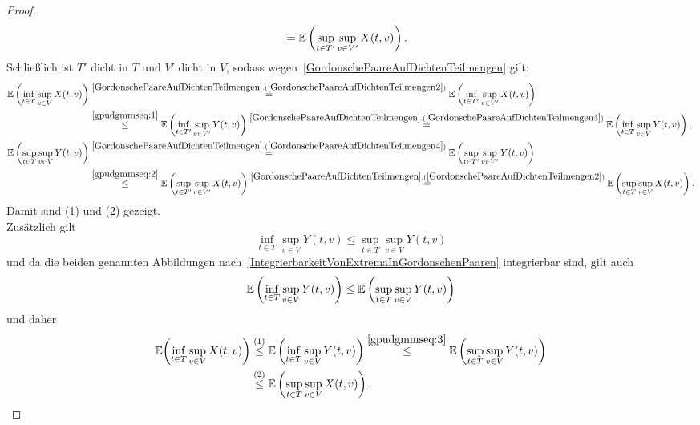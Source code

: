 \begin{proof}
\begin{align}
&= \mathbb{E}\left(\sup_{t \in T'}\sup_{v \in V'}X(t, v)\right)\text.
\label{gpudgmmseq:2}
\end{align}
Schließlich ist $T'$ dicht in $T$ und $V'$ dicht in $V$, sodass wegen~\ref{GordonschePaareAufDichtenTeilmengen} gilt:
\begin{align*}
\E\left(\inf_{t \in T}\sup_{v\in V}X(t,v) \right)
&\overset{\refclaim{GordonschePaareAufDichtenTeilmengen}
{GordonschePaareAufDichtenTeilmengen2}}=
\E\left(\inf_{t \in T'}\sup_{v\in V'}X(t,v) \right)\\
& \overset{\eqref{gpudgmmseq:1}}\le
\E\left(\inf_{t \in T'}\sup_{v\in V'}Y(t,v) \right)
\overset{\refclaim{GordonschePaareAufDichtenTeilmengen}
{GordonschePaareAufDichtenTeilmengen4}}=
\E\left(\inf_{t \in T}\sup_{v\in V}Y(t,v) \right)\text,\\
\E\left(\sup_{t \in T}\sup_{v\in V}Y(t,v) \right)
&\overset{\refclaim{GordonschePaareAufDichtenTeilmengen}
{GordonschePaareAufDichtenTeilmengen4}}=
\E\left(\sup_{t \in T'}\sup_{v\in V'}Y(t,v) \right)\\
& \overset{\eqref{gpudgmmseq:2}}\le
\E\left(\sup_{t \in T'}\sup_{v\in V'}X(t,v) \right)
\overset{\refclaim{GordonschePaareAufDichtenTeilmengen}
{GordonschePaareAufDichtenTeilmengen2}}=
\E\left(\sup_{t \in T}\sup_{v\in V}X(t,v) \right)\text.
\end{align*}
Damit sind (1) und (2) gezeigt.\\
Zusätzlich gilt
\[\inf_{t \in T}\sup_{v \in V}Y(t,v) \le \sup_{t \in T}\sup_{v \in V}Y(t,v)\]
und da die beiden genannten Abbildungen nach~\ref{IntegrierbarkeitVonExtremaInGordonschenPaaren} integrierbar sind, gilt
auch
\begin{align} \mathbb{E}\left(\inf_{t \in T}\sup_{v \in V}Y(t,v) \right) 
\le \mathbb{E}\left(\sup_{t \in T}\sup_{v \in V}Y(t,v) \right)
\label{gpudgmmseq:3}
\end{align}
und daher
\begin{align*}
\mathbb{E}\bigg(\underset{t \in T}\inf\,\underset{v\in V}\sup\,X(t, v)\bigg) & \overset{(1)}\le 
\mathbb{E}\left(\underset{t \in T}\inf\,\underset{v\in V}\sup\,Y(t, v)\right)
\overset{\eqref{gpudgmmseq:3}}\le 
\mathbb{E}\left(\underset{t \in T}\sup\,\underset{v\in V}\sup\,Y(t, v)\right)\\& \overset{(2)}\le
\mathbb{E}\left(\underset{t \in T}\sup\,\underset{v\in V}\sup\,X(t, v)\right)\text.
\end{align*}
\end{proof}